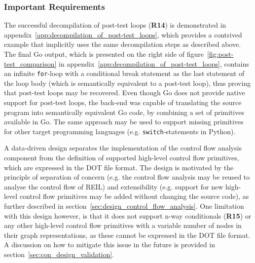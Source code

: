 
\subsubsection{Important Requirements}
\label{sec:eval_control_flow_analysis_library_important_requirements}


The successful decompilation of post-test loops (\textbf{R14}) is demonstrated in appendix~\ref{app:decompilation_of_post-test_loops}, which provides a contrived example that implicitly uses the same decompilation steps as described above. The final Go output, which is presented on the right side of figure~\ref{fig:post-test_comparison} in appendix~\ref{app:decompilation_of_post-test_loops}, contains an infinite \texttt{for}-loop with a conditional break statement as the last statement of the loop body (which is semantically equivalent to a post-test loop), thus proving that post-test loops may be recovered. Even though Go does not provide native support for post-test loops, the back-end was capable of translating the source program into semantically equivalent Go code, by combining a set of primitives available in Go. The same approach may be used to support missing primitives for other target programming languages (e.g. \texttt{switch}-statements in Python).


A data-driven design separates the implementation of the control flow analysis component from the definition of supported high-level control flow primitives, which are expressed in the DOT file format. The design is motivated by the principle of separation of concern (e.g. the control flow analysis may be reused to analyse the control flow of REIL) and extensibility (e.g. support for new high-level control flow primitives may be added without changing the source code), as further described in section~\ref{sec:design_control_flow_analysis}. One limitation with this design however, is that it does not support n-way conditionals (\textbf{R15}) or any other high-level control flow primitives with a variable number of nodes in their graph representations, as these cannot be expressed in the DOT file format. A discussion on how to mitigate this issue in the future is provided in section~\ref{sec:con_design_validation}.
